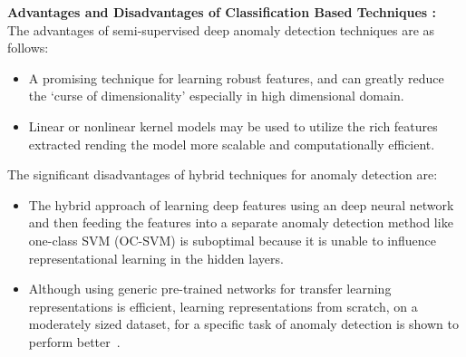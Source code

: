 \textbf{Advantages and Disadvantages of Classification Based Techniques :}\\
The advantages of semi-supervised deep anomaly detection techniques are as follows:
\begin{itemize}
\item  A promising technique for learning robust features, and can greatly reduce the ‘curse of dimensionality’ especially in high dimensional domain.
\item  Linear or nonlinear kernel models may be used to utilize the rich features extracted rending the model more scalable and computationally efficient.
\end{itemize}
The significant disadvantages of hybrid techniques for anomaly detection are:
\begin{itemize}
\item  The hybrid approach of learning deep features using an deep neural network and then feeding the features into a separate anomaly detection method like one-class SVM (OC-SVM) is suboptimal because it is unable to influence representational learning in the hidden layers.
\item  Although using generic pre-trained networks for transfer learning representations is efficient, learning representations from scratch, on a moderately sized dataset, for a specific task of anomaly detection is shown to perform better~\cite{andrews2016transfer}.
\end{itemize}












